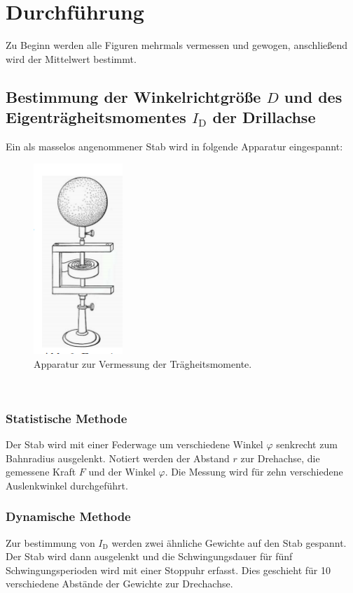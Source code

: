 \section{Durchführung}
\label{sec:Aufbau und Durchführung}
Zu Beginn werden alle Figuren mehrmals vermessen und gewogen, anschließend wird der Mittelwert bestimmt.
\subsection{Bestimmung der Winkelrichtgröße $D$ und des Eigenträgheitsmomentes $I_{\mathrm{D}}$ der Drillachse}
Ein als masselos angenommener Stab wird in folgende Apparatur eingespannt:
  \begin{figure}[h]
      \centering
      \includegraphics[width=0.3\textwidth]{Apparatur.PNG}
      \caption{Apparatur zur Vermessung der Trägheitsmomente.\cite{skript}}
      \label{abb:apparatur}
  \end{figure}\\
\subsubsection{Statistische Methode}
Der Stab wird mit einer Federwage um verschiedene Winkel $\varphi$ senkrecht zum Bahnradius ausgelenkt.
Notiert werden der Abstand $r$ zur Drehachse, die gemessene Kraft $F$ und der Winkel $\varphi$.
Die Messung wird für zehn verschiedene Auslenkwinkel durchgeführt.

\subsubsection{Dynamische Methode}
Zur bestimmung von $I_{\mathrm{D}}$ werden zwei ähnliche Gewichte auf den Stab gespannt. Der Stab wird dann ausgelenkt und
die Schwingungsdauer für fünf Schwingungsperioden wird mit einer Stoppuhr erfasst.
Dies geschieht für 10 verschiedene Abstände der Gewichte zur Drechachse.

